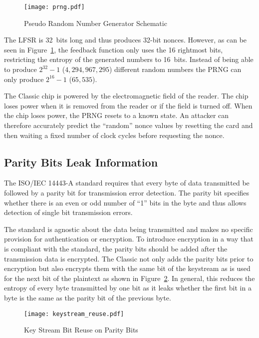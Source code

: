 \documentclass[dissertation.tex]{subfiles}
\begin{document}
  \begin{figure}[h]
    \centering
    \texttt{[image: prng.pdf]}
    \caption{Pseudo Random Number Generator Schematic}\label{fig:prng}
  \end{figure}

  The LFSR is \SI{32}{bits} long and thus produces 32-bit nonces. However, as can be seen in Figure~\ref{fig:prng}, the feedback function only uses the 16 rightmost bits, restricting the entropy of the generated numbers to \SI{16}{bits}. Instead of being able to produce $2^{32}-1$ ($4,294,967,295$) different random numbers the PRNG can only produce $2^{16}-1$ ($65,535$).

  The \mifare{} Classic chip is powered by the electromagnetic field of the reader. The chip loses power when it is removed from the reader or if the field is turned off. When the chip loses power, the PRNG resets to a known state. An attacker can therefore accurately predict the ``random'' nonce values by resetting the card and then waiting a fixed number of clock cycles before requesting the nonce.

  \subsection{Parity Bits Leak Information}

  The ISO/IEC 14443-A standard requires that every byte of data transmitted be followed by a parity bit for transmission error detection. The parity bit specifies whether there is an even or odd number of ``1'' bits in the byte and thus allows detection of single bit transmission errors.

  The standard is agnostic about the data being transmitted and makes no specific provision for authentication or encryption. To introduce encryption in a way that is compliant with the standard, the parity bits should be added after the transmission data is encrypted. The \mifare{} Classic not only adds the parity bits prior to encryption but also encrypts them with the same bit of the keystream as is used for the next bit of the plaintext as shown in Figure~\ref{fig:keystream_reuse}. In general, this reduces the entropy of every byte transmitted by one bit as it leaks whether the first bit in a byte is the same as the parity bit of the previous byte.

  \begin{figure}[h]
    \centering
    \texttt{[image: keystream\_reuse.pdf]}
    \caption{Key Stream Bit Reuse on Parity Bits}\label{fig:keystream_reuse}
  \end{figure}
\end{document}
